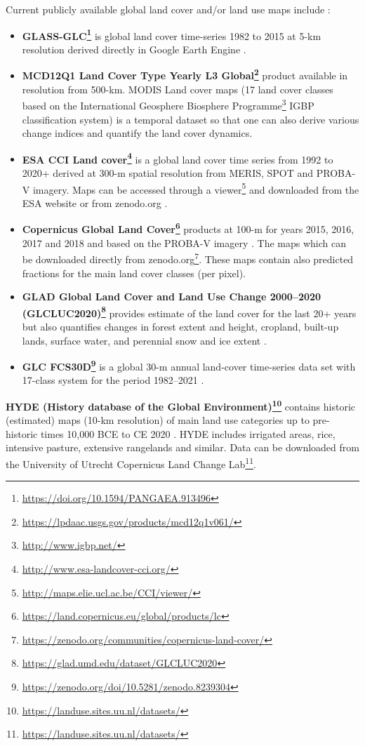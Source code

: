 \documentclass[
  graybox,natbib,nospthms]{svmono}
\providecommand{\tightlist}{%
  \setlength{\itemsep}{0pt}\setlength{\parskip}{0pt}}
\providecommand{\tightlist}{\setlength{\itemsep}{0pt}\setlength{\parskip}{0pt}}
\renewcommand{\href}[2]{#2 (\url{#1})}
\renewcommand{\href}[2]{#2\footnote{\url{#1}}}
\begin{document}
Current publicly available global land cover and/or land use maps include \citep{Liu2021}:

\begin{itemize}
\tightlist
\item
  \textbf{\href{https://doi.org/10.1594/PANGAEA.913496}{GLASS-GLC}} is global land cover time-series 1982 to 2015 at 5-km resolution derived directly in Google Earth Engine \citep{Liu2020ESSD}.
\item
  \textbf{\href{https://lpdaac.usgs.gov/products/mcd12q1v061/}{MCD12Q1 Land Cover Type Yearly L3 Global}} product available in resolution from 500-km. MODIS Land cover maps (17 land cover classes based on the \href{http://www.igbp.net/}{International Geosphere Biosphere Programme} IGBP classification system) is a temporal dataset so that one can also derive various change indices and quantify the land cover dynamics.
\item
  \textbf{\href{http://www.esa-landcover-cci.org/}{ESA CCI Land cover}} is a global land cover time series from 1992 to 2020+ derived at 300-m spatial resolution from MERIS, SPOT and PROBA-V imagery. Maps can be accessed through a \href{http://maps.elie.ucl.ac.be/CCI/viewer/}{viewer} and downloaded from the ESA website or from zenodo.org \citep{defourny2012land}.
\item
  \textbf{\href{https://land.copernicus.eu/global/products/lc}{Copernicus Global Land Cover}} products at 100-m for years 2015, 2016, 2017 and 2018 and based on the PROBA-V imagery \citep{rs12061044}. The maps which can be downloaded directly from \href{https://zenodo.org/communities/copernicus-land-cover/}{zenodo.org}. These maps contain also predicted fractions for the main land cover classes (per pixel).
\item
  \textbf{\href{https://glad.umd.edu/dataset/GLCLUC2020}{GLAD Global Land Cover and Land Use Change 2000--2020 (GLCLUC2020)}} provides estimate of the land cover for the last 20+ years but also quantifies changes in forest extent and height, cropland, built-up lands, surface water, and perennial snow and ice extent \citep{Potapov2022}.
\item
  \textbf{\href{https://zenodo.org/doi/10.5281/zenodo.8239304}{GLC FCS30D}} is a global 30-m annual land-cover time-series data set with 17-class system for the period 1982--2021 \citep{Zhang2021}.
\end{itemize}

\textbf{\href{https://landuse.sites.uu.nl/datasets/}{HYDE (History database of the Global Environment)}} contains historic (estimated) maps (10-km resolution) of main land use
categories up to pre-historic times 10,000 BCE to CE 2020 \citep{klein2017anthropogenic}.
HYDE includes irrigated areas, rice, intensive pasture, extensive rangelands and similar. Data can be downloaded from
the \href{https://landuse.sites.uu.nl/datasets/}{University of Utrecht Copernicus Land Change Lab}.
\end{document}
